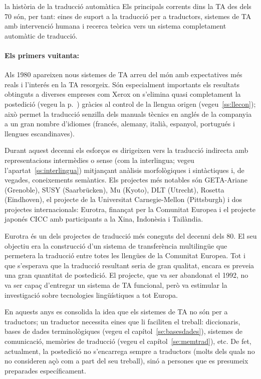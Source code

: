 \begin{persabermes}{la història de la traducció automàtica}
Els principals corrents dins la TA des dels 70 són, per tant: eines de
suport a la traducció per a traductors, sistemes de TA amb intervenció
humana i recerca teòrica vers un sistema completament automàtic de
traducció.

\paragraph{Els primers vuitanta:} Als 1980 apareixen nous sistemes de
TA arreu del món amb expectatives més reals i l'interés en la TA
resorgeix.  Són especialment importants els resultats obtinguts a
diverses empreses com Xerox on s'elimina quasi completament la
postedició (vegeu la p.~\pageref{pg:homografia}) gràcies al control de
la llengua origen (vegeu~\ref{ss:llecon}); això permet la traducció senzilla dels manuals
tècnics en anglés de la companyia a un gran nombre d'idiomes (francés,
alemany, italià, espanyol, portugués i llengues escandinaves).

Durant aquest decenni els esforços es dirigeixen vers la traducció
indirecta amb representacions intermèdies o sense (com la interlingua;
vegeu l'apartat~\ref{ss:interlingua}) mitjançant anàlisis
morfològiques i sintàctiques i, de vegades, coneixements semàntics.
Els projectes més notables són GETA-Ariane (Grenoble), SUSY
(Saarbrücken), Mu (Kyoto), DLT (Utrecht), Rosetta (Eindhoven), el
projecte de la Universitat Carnegie-Mellon (Pittsburgh) i dos
projectes internacionals: Eurotra, finançat per la Comunitat Europea i
el projecte japonés CICC amb participants a la Xina, Indonèsia i
Tailàndia.

Eurotra és un dels projectes de traducció més coneguts del decenni
dels 80. El seu objectiu era la construcció d'un sistema de
transferència multilingüe que permetera la traducció entre totes les
llengües de la Comunitat Europea.  Tot i que s'esperava que la
traducció resultant seria de gran qualitat, encara es preveia una gran
quantitat de postedició. El projecte, que va ser abandonat el 1992, no
va ser capaç d'entregar un sistema de TA funcional, però va estimular
la investigació sobre tecnologies lingüístiques a tot Europa.

En aquests anys es consolida la idea que els sistemes de TA no són per
a traductors; un traductor necessita eines que li faciliten el
treball: diccionaris, bases de dades terminològiques (vegeu el
capítol~\ref{se:basesdades}), sistemes de comunicació, memòries de
traducció (vegeu el capítol~\ref{se:memtrad}), etc.  De fet,
actualment, la postedició no s'encarrega sempre a traductors (molts
dels quals no no consideren açò com a part del seu treball), sinó a
persones que es presumeix preparades específicament.


\end{persabermes}
